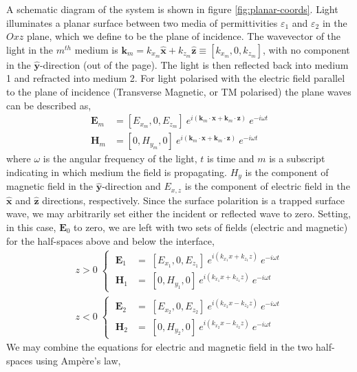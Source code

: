 \documentclass[oneside,10pt,a4paper]{book}
\begin{document}
A schematic diagram of the system is shown in figure \ref{fig:planar-coords}. Light illuminates a planar surface between two media of permittivities $\varepsilon_1$ and $\varepsilon_2$ in the $Oxz$ plane, which we define to be the plane of incidence. The wavevector of the light in the $m^{th}$ medium is $\mathbf{k}_m = k_{x_m}\mathbf{\hat{x}}+k_{z_m}\mathbf{\hat{z}} \equiv [k_{x_m},0,k_{z_m}]$, with no component in the $\mathbf{\hat{y}}$-direction (out of the page). The light is then reflected back into medium 1 and refracted into medium 2.  For light polarised with the electric field parallel to the plane of incidence (Transverse Magnetic, or TM polarised) the plane waves can be described as,
\begin{align*}
\mathbf{E}_m&=[E_{x_m},0,E_{z_m}]\:e^{i(\mathbf{k}_m\cdot \mathbf{x}+\mathbf{k}_m\cdot\mathbf{z})}\:e^{-i\omega t}\\
\mathbf{H}_m&=[0,H_{y_m},0]\:e^{i(\mathbf{k}_m\cdot \mathbf{x}+\mathbf{k}_m\cdot\mathbf{z})}\:e^{-i\omega t}
\end{align*}
where $\omega$ is the angular frequency of the light, $t$ is time and $m$ is a subscript indicating in which medium the field is propagating. $H_{y}$ is the component of magnetic field in the $\mathbf{\hat{y}}$-direction and $E_{x,z}$ is the component of electric field in the $\mathbf{\hat{x}}$ and  $\mathbf{\hat{z}}$ directions, respectively. 
Since the surface polarition is a trapped surface wave, we may arbitrarily set either the incident or reflected wave to zero. Setting, in this case, $\mathbf{E}_0$ to zero, we are left with two sets of fields (electric and magnetic) for the half-spaces above and below the interface,
\begin{align}
z>0\;\begin{cases}\;\mathbf{E}_1&=\;[E_{x_1},0,E_{z_1}]\:e^{i(k_{x_1}x+k_{z_1}z)}\:e^{-i\omega t}\\
\;\mathbf{H}_1&=\;[0,H_{y_1},0]\:e^{i(k_{x_1}x+k_{z_1}z)}\:e^{-i\omega t}
\end{cases}\label{eq:planewaveset1}\\
z<0\;\begin{cases}\;\mathbf{E}_2&=\;[E_{x_2},0,E_{z_2}]\:e^{i(k_{x_2}x-k_{z_2}z)}\:e^{-i\omega t}\\
\;\mathbf{H}_2&=\;[0,H_{y_2},0]\:e^{i(k_{x_2}x-k_{z_2}z)}\:e^{-i\omega t}
\end{cases}\label{eq:planewaveset2}
\end{align}
We may combine the equations for electric and magnetic field in the two half-spaces using Amp\`ere's law,
\end{document}
